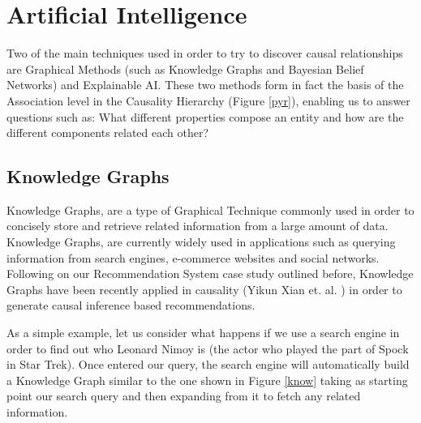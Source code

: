 \chapter{Artificial Intelligence}
\setcounter{secnumdepth}{5}
\label{ch:AI}
\setlength\lineskip{0pt}
\vspace*{15pt}

 
 
\lstset{style=mystyle}

Two of the main techniques used in order to try to discover causal relationships are Graphical Methods (such as Knowledge Graphs and Bayesian Belief Networks) and Explainable AI. These two methods form in fact the basis of the Association level in the Causality Hierarchy (Figure \ref{pyr}), enabling us to answer questions such as: What different properties compose an entity and how are the different components related each other?

\section{Knowledge Graphs}

Knowledge Graphs, are a type of Graphical Technique commonly used in order to concisely store and retrieve related information from a large amount of data. Knowledge Graphs, are currently widely used in applications such as querying information from search engines, e-commerce websites and social networks. Following on our Recommendation System case study outlined before, Knowledge Graphs have been recently applied in causality (Yikun Xian et. al. \cite{reinforcement}) in order to generate causal inference based recommendations.


As a simple example, let us consider what happens if we use a search engine in order to find out who Leonard Nimoy is (the actor who played the part of Spock in Star Trek). Once entered our query, the search engine will automatically build a Knowledge Graph similar to the one shown in Figure \ref{know} taking as starting point our search query and then expanding from it to fetch any related information.

